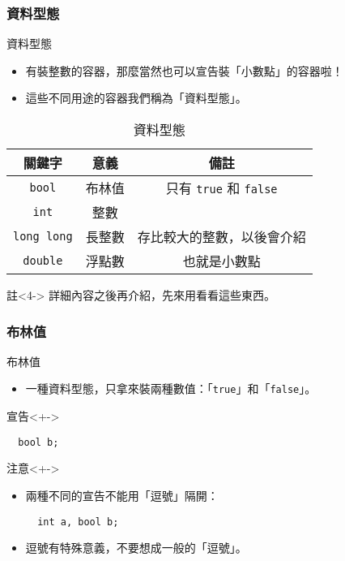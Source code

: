 \documentclass[utf8]{beamer}
\begin{document}
\begin{CJK}{UTF8}{bkai}
\begin{frame}[fragile]
  \frametitle{資料型態}
  \begin{block}{資料型態}
    \begin{itemize}
    \item<1-> 有裝整數的容器，那麼當然也可以宣告裝「小數點」的容器啦！
    \item<2-> 這些不同用途的容器我們稱為「\alert{資料型態}」。
    \end{itemize}
  \end{block}
  \pause\pause
  \begin{table}[h]
    \begin{tabular}{|c|c|c|}
    \hline
    關鍵字                   & 意義 & 備註\\
    \hline
    \lstinline{bool}{}      & 布林值 & 只有 \lstinline{true}{} 和 \lstinline{false}{}\\
    \hline
    \lstinline{int}{}       & 整數 &\\
    \hline
    \lstinline{long long}{} & 長整數 & 存比較大的整數，以後會介紹\\
    \hline
    \lstinline{double}{}    & \alert{浮點數} & 也就是小數點\\
    \hline
    \end{tabular}
    \caption{資料型態}
  \end{table}
  \begin{exampleblock}{註}<4->
  詳細內容之後再介紹，先來用看看這些東西。
  \end{exampleblock}
\end{frame}

\begin{frame}[fragile]
  \frametitle{布林值}
  \begin{exampleblock}{布林值}
    \begin{itemize}[<+->]
    \item 一種資料型態，只拿來裝兩種數值：「\lstinline{true}{}」和「\lstinline{false}{}」。
    \end{itemize}
  \end{exampleblock}
  \begin{block}{宣告}<+->
    \begin{lstlisting}
  bool b;
    \end{lstlisting}
  \end{block}
  \begin{alertblock}{注意}<+->
    \begin{itemize}
    \item 兩種不同的宣告不能用「逗號」隔開：
      \begin{lstlisting}
  int a, bool b;
      \end{lstlisting}
    \item<+-> 逗號有\alert{特殊意義}，不要想成一般的「逗號」。
    \end{itemize}
  \end{alertblock}
\end{frame}


\end{CJK}
\end{document}
